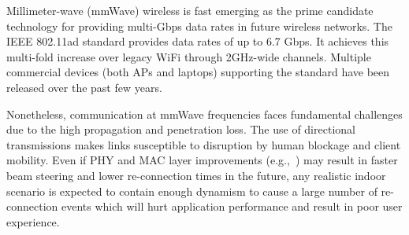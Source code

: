 Millimeter-wave (mmWave) wireless is fast emerging as the prime
candidate technology for providing multi-Gbps data rates in future wireless networks.
The IEEE 802.11ad
standard 
provides data rates of up to 6.7 Gbps. 
It
achieves this multi-fold increase over legacy WiFi through
2GHz-wide channels.
Multiple commercial devices (both APs and laptops) supporting the standard have been
released over the past few years. 

Nonetheless, communication at mmWave frequencies faces fundamental
challenges due to the high propagation and penetration loss. %
The use of directional transmissions 
makes
links susceptible to disruption by human blockage and client
mobility. 
Even if PHY and MAC layer
improvements (e.g.,~\cite{nitsche:infocom2015,sur:nsdi2016}) may result in faster beam steering and lower re-connection times in the future, any realistic
indoor scenario is expected to contain enough dynamism
to cause a large number of
re-connection events which will hurt application performance and
result in poor user experience.

